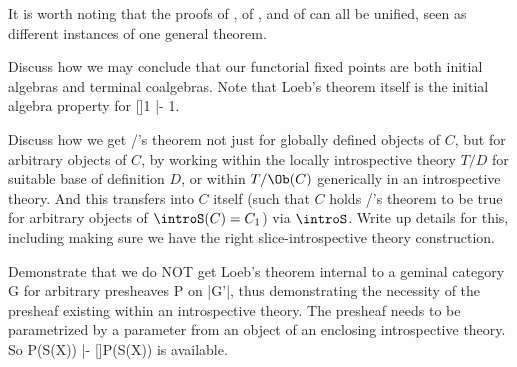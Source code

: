 
It is worth noting that the proofs of , of , and of  can all be unified, seen as different instances of one general theorem. 

\begin{TODOblock}
Discuss how we may conclude that our functorial fixed points are both initial algebras and terminal coalgebras. Note that Loeb's theorem itself is the initial algebra property for []1 |- 1.
\end{TODOblock}

\begin{TODOblock}
Discuss how we get \Loeb/'s theorem not just for globally defined objects of $C$, but for arbitrary objects of $C$, by working within the locally introspective theory $T/D$ for suitable base of definition $D$, or within $T/\Ob(C)$ generically in an introspective theory. And this transfers into $C$ itself (such that $C$ holds \Loeb/'s theorem to be true for arbitrary objects of $\introS(C) = C_1$) via $\introS$. Write up details for this, including making sure we have the right slice-introspective theory construction.
\end{TODOblock}

\begin{TODOblock}
Demonstrate that we do NOT get Loeb's theorem internal to a geminal category G for arbitrary presheaves P on |G'|, thus demonstrating the necessity of the presheaf existing within an introspective theory. The presheaf needs to be parametrized by a parameter from an object of an enclosing introspective theory. So P(S(X)) |- []P(S(X)) is available.
\end{TODOblock}

